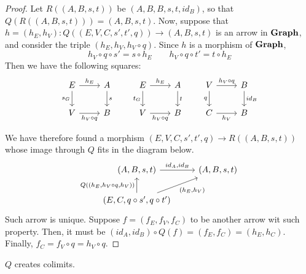 \begin{proof}
    Let $R((A, B, s, t))$ be $(A, B, B, s, t, id_B)$, so that $Q(R((A, B, s, t))) = (A, B, s, t)$. Now, suppose that $h = (h_E, h_V): Q((E, V, C, s', t', q)) \to (A, B, s, t)$  is an arrow in $\mathbf{Graph}$, and consider the triple $(h_E, h_V, h_V \circ q)$. Since $h$ is a morphism of $\mathbf{Graph}$, 
    \[h_V\circ q\circ s'= s\circ h_E \qquad  h_V\circ q\circ t' = t\circ h_E\]
    Then we have the following squares:
    \[
        \begin{tikzcd}
            E \arrow[r, "{h_E}"] \arrow[d, "{s_G}"swap] & A \arrow[d, "s"] \\
            V \arrow[r, "{h_V \circ q}"swap] & B
        \end{tikzcd}
        \qquad
        \begin{tikzcd}
            E \arrow[r, "{h_E}"] \arrow[d, "{t_G}"swap] & A \arrow[d, "t"] \\
            V \arrow[r, "{h_V \circ q}"swap] & B
        \end{tikzcd}
        \qquad
        \begin{tikzcd}
            V \arrow[r, "{h_V\circ q}"] \arrow[d, "q" swap] & B \arrow[d, "{id_B}"] \\
            C \arrow[r, "{h_V}"swap] & B
        \end{tikzcd}
    \]

    We have therefore found a morphism $(E, V, C, s', t', q) \to R((A, B, s, t))$ whose image through $Q$ fits in the diagram below.
    \[
        \begin{tikzcd}
            (A, B, s, t) \arrow[r, "{id_A, id_B}"] & (A, B, s, t)\\
            (E, C, q\circ s', q\circ t') \arrow[u, "{Q((h_E, h_V \circ q, h_V))}"] \arrow[ur, "{(h_E, h_V)}" swap] 
        \end{tikzcd}
    \]
    Such arrow is unique. Suppose $f = (f_E, f_V, f_C)$ to be another arrow wit such property. Then, it must be $(id_A, id_B) \circ Q(f) = (f_E, f_C) = (h_E, h_C)$. Finally, $f_C = f_V \circ q = h_V \circ q$. 
\end{proof}

\begin{prop}\label{prop:quot_creat_colims}
    $Q$ creates colimits.
\end{prop}


